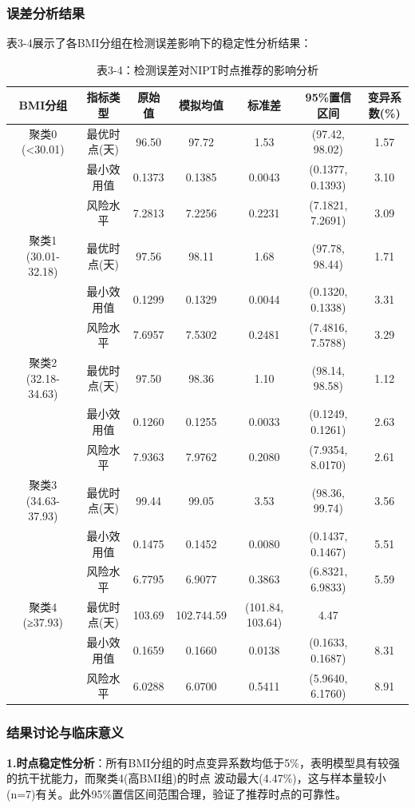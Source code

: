 \documentclass{article}
\begin{document}
\subsubsection{\textbf{误差分析结果}}
表3-4展示了各BMI分组在检测误差影响下的稳定性分析结果：
\begin{table}[htbp]
    \centering
    \footnotesize
    \caption{表3-4：检测误差对NIPT时点推荐的影响分析}
    \begin{tabular*}{\linewidth}{@{\extracolsep{\fill}}c c c c c c c}
        \toprule  %
        BMI分组&指标类型&原始值&模拟均值&标准差&95\%置信区间&变异系数(\%)    \\
        \midrule  %
        聚类0 (<30.01)&最优时点(天)&96.50&97.72&1.53&(97.42, 98.02)&1.57    \\
        &最小效用值&0.1373&0.1385&0.0043&(0.1377, 0.1393)&3.10\\
        &风险水平&7.2813&7.2256&0.2231&(7.1821, 7.2691)&3.09\\
        聚类1 (30.01-32.18)&最优时点(天)&97.56&98.11&1.68&(97.78, 98.44)&1.71 \\
        &最小效用值&0.1299&0.1329&0.0044&(0.1320, 0.1338)&3.31 \\
        &风险水平&7.6957&7.5302&0.2481&(7.4816, 7.5788)&3.29 \\
        聚类2 (32.18-34.63)&最优时点(天)&97.50&98.36&1.10&(98.14, 98.58)&1.12 \\
        &最小效用值&0.1260&0.1255&0.0033&(0.1249, 0.1261)&2.63 \\
        &风险水平&7.9363&7.9762&0.2080&(7.9354, 8.0170)&2.61 \\
        聚类3 (34.63-37.93)&最优时点(天)&99.44&99.05&3.53&(98.36, 99.74)&3.56 \\
        &最小效用值&0.1475&0.1452&0.0080&(0.1437, 0.1467)&5.51 \\
        &风险水平&6.7795&6.9077&0.3863&(6.8321, 6.9833)&5.59 \\
        聚类4 (≥37.93)&最优时点(天)&103.69&102.744.59&(101.84, 103.64)&4.47 \\
        &最小效用值&0.1659&0.1660&0.0138&(0.1633, 0.1687)&8.31 \\
        &风险水平&6.0288&6.0700&0.5411&(5.9640, 6.1760)&8.91 \\
        \bottomrule  %
    \end{tabular*}
    \label{tab:crops_booktabs}
\end{table}
\subsubsection{\textbf{结果讨论与临床意义}}
\textbf{1.时点稳定性分析}：所有BMI分组的时点变异系数均低于5\%，表明模型具有较强的抗干扰能力，而聚类4(高BMI组)的时点
波动最大(4.47\%)，这与样本量较小(n=7)有关。此外95\%置信区间范围合理，验证了推荐时点的可靠性。
\end{document}
